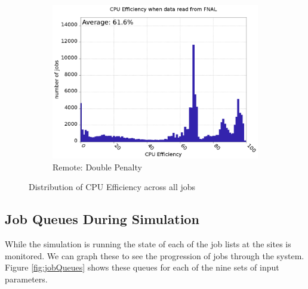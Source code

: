 \documentclass[a4paper]{jpconf}
\begin{document}
\begin{figure}
\begin{center}
\begin{subfigure}{0.3\textwidth}
      \includegraphics[width=\textwidth]{figures/F_FP0_RP1CPUEff.png}
      \caption{Remote: Double Penalty\label{fig:cpuEffRemoteD}}
    \end{subfigure}
    \caption{Distribution of CPU Efficiency across all
      jobs\label{fig:cpuEff}}
  \end{center}
\end{figure}


\subsection{Job Queues During Simulation}

While the simulation is running the state of each of the job lists at
the sites is monitored. We can graph these to see the progression of
jobs through the system. Figure \ref{fig:jobQueues} shows these queues
for each of the nine sets of input parameters.
\end{document}
